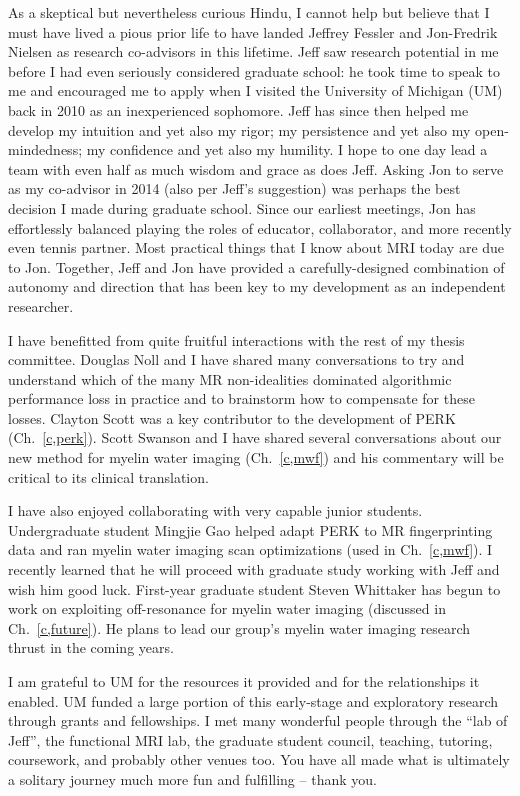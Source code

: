 \setlength{\parindent}{0ex}%
As a skeptical but nevertheless curious Hindu,
I cannot help but believe
that I must have lived a pious prior life
to have landed Jeffrey Fessler and Jon-Fredrik Nielsen
as research co-advisors 
in this lifetime.
Jeff saw research potential in me
before I had even seriously considered graduate school:
he took time to speak to me
and encouraged me to apply
when I visited the University of Michigan (UM)
back in 2010 as an inexperienced sophomore.
Jeff has since then helped me develop
my intuition and yet also my rigor;
my persistence and yet also my open-mindedness;
my confidence and yet also my humility.
I hope to one day lead a team 
with even half as much wisdom and grace
as does Jeff.
Asking Jon to serve as my co-advisor in 2014
(also per Jeff's suggestion)
was perhaps the best decision
I made during graduate school.
Since our earliest meetings,
Jon has effortlessly balanced playing the roles
of educator, collaborator, 
and more recently even tennis partner.
Most practical things 
that I know about MRI today 
are due to Jon.
Together,
Jeff and Jon have provided
a carefully-designed combination
of autonomy and direction
that has been key 
to my development 
as an independent researcher.

\setlength{\parindent}{4ex}%
I have benefitted 
from quite fruitful interactions
with the rest of my thesis committee.
Douglas Noll and I have shared many conversations
to try and understand 
which of the many MR non-idealities
dominated algorithmic performance loss in practice
and 
to brainstorm how to compensate for these losses.
Clayton Scott was a key contributor
to the development of PERK (Ch.~\ref{c,perk}).
Scott Swanson and I have shared several conversations
about our new method for myelin water imaging (Ch.~\ref{c,mwf})
and his commentary will be critical 
to its clinical translation.

I have also enjoyed collaborating 
with very capable junior students.
Undergraduate student Mingjie Gao 
helped adapt PERK to MR fingerprinting data
\cite{nataraj:17:slw}
and ran myelin water imaging scan optimizations 
(used in Ch.~\ref{c,mwf}).
I recently learned
that he will proceed with graduate study
working with Jeff
and wish him good luck.
First-year graduate student Steven Whittaker
has begun to work
on exploiting off-resonance for myelin water imaging
(discussed in Ch.~\ref{c,future}).
He plans to lead our group's 
myelin water imaging research thrust
in the coming years.

I am grateful to UM
for the resources it provided
and for the relationships it enabled.
UM funded a large portion
of this early-stage and exploratory research
through grants and fellowships.
I met many wonderful people 
through the ``lab of Jeff'',
the functional MRI lab,
the graduate student council, 
teaching,
tutoring,
coursework,
and probably other venues too.
You have all made 
what is ultimately a solitary journey
much more fun and fulfilling -- thank you.

